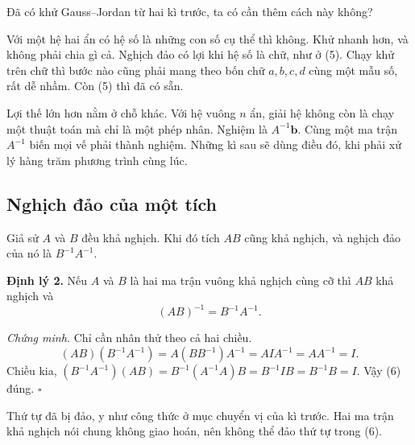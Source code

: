 \documentclass[12pt,a4paper]{article}
\begin{document}
Đã có khử Gauss--Jordan từ hai kì trước, ta có cần thêm cách này không?

Với một hệ hai ẩn có hệ số là những con số cụ thể thì không. Khử nhanh hơn, và không phải chia gì cả. Nghịch đảo có lợi khi hệ số là chữ, như ở (5). Chạy khử trên chữ thì bước nào cũng phải mang theo bốn chữ \(a,b,c,d\) cùng một mẫu số, rất dễ nhầm. Còn (5) thì đã có sẵn.

Lợi thế lớn hơn nằm ở chỗ khác. Với hệ vuông \(n\) ẩn, giải hệ không còn là chạy một thuật toán mà chỉ là một phép nhân. Nghiệm là \(A^{-1}\mathbf{b}\). Cùng một ma trận \(A^{-1}\) biến mọi vế phải thành nghiệm. Những kì sau sẽ dùng điều đó, khi phải xử lý hàng trăm phương trình cùng lúc.

\subsection{Nghịch đảo của một tích}

Giả sử \(A\) và \(B\) đều khả nghịch. Khi đó tích \(AB\) cũng khả nghịch, và nghịch đảo của nó là \(B^{-1}A^{-1}\).

\textbf{Định lý 2.} Nếu \(A\) và \(B\) là hai ma trận vuông khả nghịch cùng cỡ thì \(AB\) khả nghịch và
$$
(AB)^{-1}=B^{-1}A^{-1}. \tag{6}
$$

\emph{Chứng minh.} Chỉ cần nhân thử theo cả hai chiều.
$$
(AB)(B^{-1}A^{-1})=A(BB^{-1})A^{-1}=AIA^{-1}=AA^{-1}=I.
$$
Chiều kia, $(B^{-1}A^{-1})(AB)=B^{-1}(A^{-1}A)B=B^{-1}IB=B^{-1}B=I$. Vậy (6) đúng. \(\square\)

Thứ tự đã bị đảo, y như công thức ở mục chuyển vị của kì trước. Hai ma trận khả nghịch nói chung không giao hoán, nên không thể đảo thứ tự trong (6).
\end{document}
